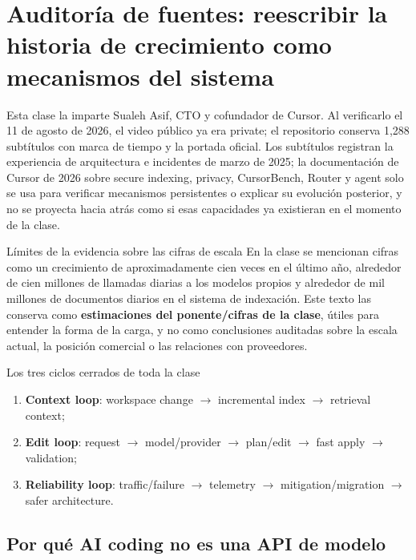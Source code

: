 \section{Auditoría de fuentes: reescribir la historia de crecimiento como mecanismos del sistema}

Esta clase la imparte Sualeh Asif, CTO y cofundador de Cursor. Al verificarlo el 11 de agosto de 2026, el video público ya era private; el repositorio conserva 1,288 subtítulos con marca de tiempo y la portada oficial. Los subtítulos registran la experiencia de arquitectura e incidentes de marzo de 2025; la documentación de Cursor de 2026 sobre secure indexing, privacy, CursorBench, Router y agent solo se usa para verificar mecanismos persistentes o explicar su evolución posterior, y no se proyecta hacia atrás como si esas capacidades ya existieran en el momento de la clase.

\begin{warningbox}{Límites de la evidencia sobre las cifras de escala}
En la clase se mencionan cifras como un crecimiento de aproximadamente cien veces en el último año, alrededor de cien millones de llamadas diarias a los modelos propios y alrededor de mil millones de documentos diarios en el sistema de indexación. Este texto las conserva como \textbf{estimaciones del ponente/cifras de la clase}, útiles para entender la forma de la carga, y no como conclusiones auditadas sobre la escala actual, la posición comercial o las relaciones con proveedores.
\end{warningbox}

\begin{importantbox}{Los tres ciclos cerrados de toda la clase}
\begin{enumerate}
  \item \textbf{Context loop}: workspace change $\rightarrow$ incremental index $\rightarrow$ retrieval context;
  \item \textbf{Edit loop}: request $\rightarrow$ model/provider $\rightarrow$ plan/edit $\rightarrow$ fast apply $\rightarrow$ validation;
  \item \textbf{Reliability loop}: traffic/failure $\rightarrow$ telemetry $\rightarrow$ mitigation/migration $\rightarrow$ safer architecture.
\end{enumerate}
\end{importantbox}

\subsection{Por qué AI coding no es una API de modelo}

